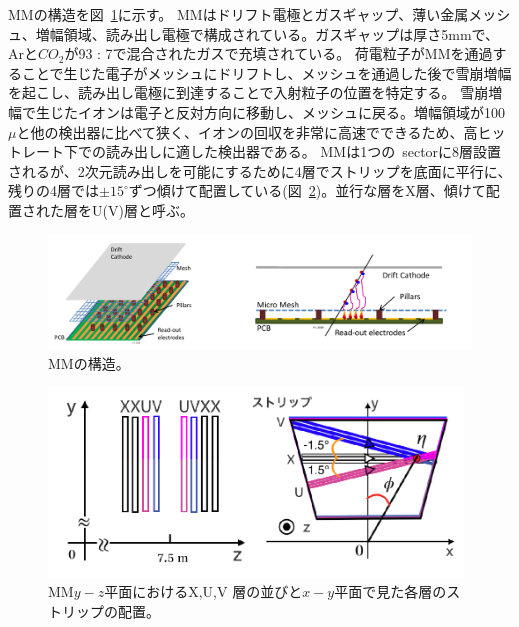 MMの構造を図~\ref{fig:2-25}に示す。
MMはドリフト電極とガスギャップ、薄い金属メッシュ、増幅領域、読み出し電極で構成されている。ガスギャップは厚さ5mmで、Arと$CO_{2}$が93 : 7で混合されたガスで充填されている。
荷電粒子がMMを通過することで生じた電子がメッシュにドリフトし、メッシュを通過した後で雪崩増幅を起こし、読み出し電極に到達することで入射粒子の位置を特定する。
雪崩増幅で生じたイオンは電子と反対方向に移動し、メッシュに戻る。増幅領域が100$\mu$と他の検出器に比べて狭く、イオンの回収を非常に高速でできるため、高ヒットレート下での読み出しに適した検出器である。
MMは1つの~sectorに8層設置されるが、2次元読み出しを可能にするために4層でストリップを底面に平行に、残りの4層では$\pm15^\circ$ずつ傾けて配置している(図~\ref{fig:2-26})。並行な層をX層、傾けて配置された層をU(V)層と呼ぶ。

\begin{figure}[h]
  \centering
  \includegraphics[clip, width=13cm]{fig/2/mm-structure.pdf}
  \caption{MMの構造\cite{article:ATLASNSWTDR}。}
  \label{fig:2-25}
\end{figure}

\begin{figure}[h]
  \centering
  \includegraphics[clip, width=11cm]{fig/2/mm_stereolayer.png}
  \caption{MM$y−z$平面におけるX,U,V 層の並びと$x−y$平面で見た各層のストリップの配置\cite{article:kumaoka}。}
  \label{fig:2-26}
\end{figure}